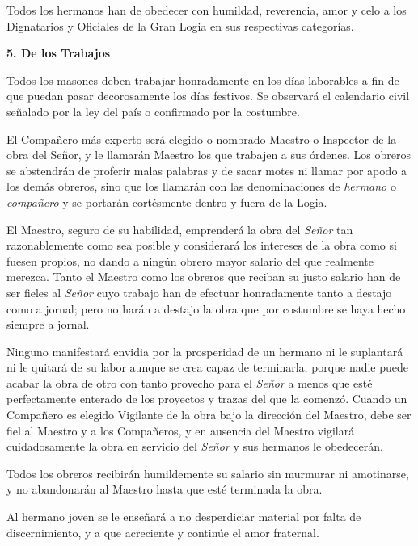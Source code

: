 \documentclass[a4paper,12pt,twoside]{book}
\begin{document}
\noindent Todos los hermanos han de obedecer con humildad, reverencia, amor y celo a los Dignatarios y Oficiales de la Gran Logia en sus respectivas categorías.

\vspace{0.5cm}

\noindent \textbf{5. De los Trabajos}

\noindent Todos los masones deben trabajar honradamente en los días laborables a fin de que puedan pasar decorosamente los días festivos. Se observará el calendario civil señalado por la ley del país o confirmado por la costumbre.

\noindent El Compañero más experto será elegido o nombrado Maestro o Inspector de la obra del Señor, y le llamarán Maestro los que trabajen a sus órdenes. Los obreros se abstendrán de proferir malas palabras y de sacar motes ni llamar por apodo a los demás obreros, sino que los llamarán con las denominaciones de \textit{hermano} o \textit{compañero} y se portarán cortésmente dentro y fuera de la Logia.

\noindent El Maestro, seguro de su habilidad, emprenderá la obra del \textit{Señor} tan razonablemente como sea posible y considerará los intereses de la obra como si fuesen propios, no dando a ningún obrero mayor salario del que realmente merezca. Tanto el Maestro como los obreros que reciban su justo salario han de ser fieles al \textit{Señor} cuyo trabajo han de efectuar honradamente tanto a destajo como a jornal; pero no harán a destajo la obra que por costumbre se haya hecho siempre a jornal.

\noindent Ninguno manifestará envidia por la prosperidad de un hermano ni le suplantará ni le quitará de su labor aunque se crea capaz de terminarla, porque nadie puede acabar la obra de otro con tanto provecho para el \textit{Señor} a menos que esté perfectamente enterado de los proyectos y trazas del que la comenzó. Cuando un Compañero es elegido Vigilante de la obra bajo la dirección del Maestro, debe ser fiel al Maestro y a los Compañeros, y en ausencia del Maestro vigilará cuidadosamente la obra en servicio del \textit{Señor} y sus hermanos le obedecerán.

\noindent Todos los obreros recibirán humildemente su salario sin murmurar ni amotinarse, y no abandonarán al Maestro hasta que esté terminada la obra.

\noindent Al hermano joven se le enseñará a no desperdiciar material por falta de discernimiento, y a que acreciente y continúe el amor fraternal.
\end{document}
